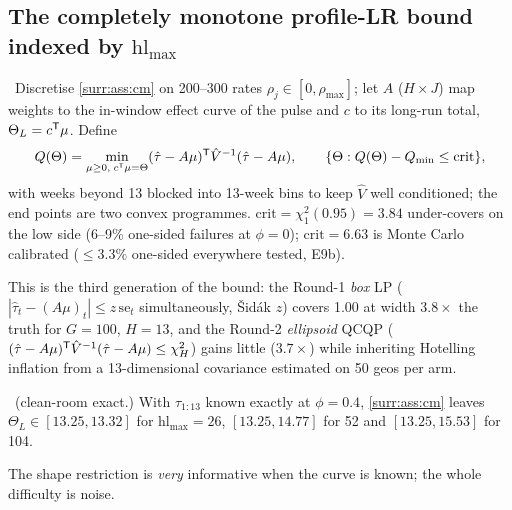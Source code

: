 \subsection{The completely monotone profile-LR bound indexed by $\mathrm{hl}_{\max}$}

\begin{construction}
\label{surr:con:profile}
\tagEstablished\ Discretise \cref{surr:ass:cm} on 200--300 rates $\rho_j \in [0, \rho_{\max}]$; let $A$ ($H \times J$) map weights to the in-window effect curve of the pulse and $c$ to its long-run total, $\Theta_L = c^{\mathsf{T}}\mu$. Define
\begin{equation}
Q(\Theta) = \min_{\mu \ge 0,\; c^{\mathsf{T}}\mu = \Theta}(\hat\tau - A\mu)^{\mathsf{T}}\hat V^{-1}(\hat\tau - A\mu), \qquad
\{\Theta : Q(\Theta) - Q_{\min} \le \mathrm{crit}\},
\label{eq:surr:profile}
\end{equation}
with weeks beyond 13 blocked into 13-week bins to keep $\hat V$ well conditioned; the end points are two convex programmes. $\mathrm{crit} = \chi^2_1(0.95) = 3.84$ under-covers on the low side (6--9\% one-sided failures at $\phi = 0$); $\mathrm{crit} = 6.63$ is Monte Carlo calibrated ($\le 3.3\%$ one-sided everywhere tested, E9b).
\end{construction}

This is the third generation of the bound: the Round-1 \emph{box} LP ($|\hat\tau_t - (A\mu)_t| \le z\,\mathrm{se}_t$ simultaneously, \v{S}id\'ak $z$) covers 1.00 at width $3.8\times$ the truth for $G = 100$, $H = 13$, and the Round-2 \emph{ellipsoid} QCQP ($(\hat\tau - A\mu)^{\mathsf{T}}\hat V^{-1}(\hat\tau - A\mu) \le \chi^2_H$) gains little ($3.7\times$) while inheriting Hotelling inflation from a 13-dimensional covariance estimated on 50 geos per arm.

\begin{proposition}
\label{surr:prop:noisefree}
\tagEstablished\ (clean-room exact.) With $\tau_{1:13}$ known exactly at $\phi = 0.4$, \cref{surr:ass:cm} leaves $\Theta_L \in [13.25, 13.32]$ for $\mathrm{hl}_{\max} = 26$, $[13.25, 14.77]$ for 52 and $[13.25, 15.53]$ for 104.
\end{proposition}

The shape restriction is \emph{very} informative when the curve is known; the whole difficulty is noise.

